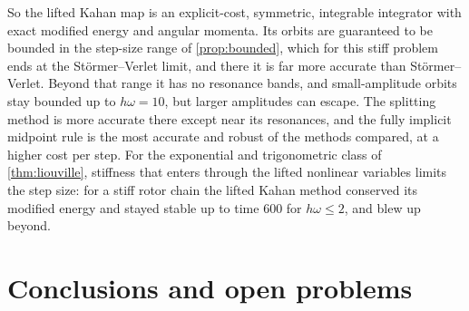 \documentclass[11pt,a4paper]{article}
\theoremstyle{definition}
\theoremstyle{remark}
\begin{document}
So the lifted Kahan map is an explicit-cost, symmetric, integrable integrator with exact modified energy and
angular momenta. Its orbits are guaranteed to be bounded in the step-size range of \cref{prop:bounded}, which
for this stiff problem ends at the St\"ormer--Verlet limit, and there it is far more accurate than
St\"ormer--Verlet. Beyond that range it has no resonance bands, and small-amplitude orbits stay bounded up to
$h\omega=10$, but larger amplitudes can escape. The splitting method is more accurate there except near its
resonances, and the fully implicit midpoint rule is the most accurate and robust of the methods compared, at a
higher cost per step. For the exponential and
trigonometric class of \cref{thm:liouville}, stiffness that enters through the lifted nonlinear variables
limits the step size: for a stiff rotor chain the lifted Kahan method conserved its modified energy and stayed
stable up to time $600$ for $h\omega\le2$, and blew up beyond.

\section{Conclusions and open problems}\label{sec:conclusion}
\end{document}

